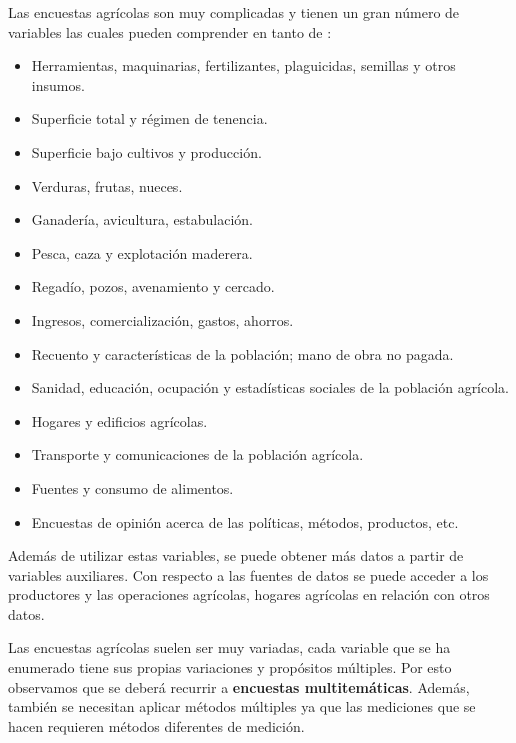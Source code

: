 \documentclass[conference]{IEEEtran}
\begin{document}
\bigbreak

Las encuestas agrícolas son muy complicadas y tienen un gran número de variables las cuales pueden comprender en tanto de \cite{organizacion-de-las-naciones-unidas-para-la-agricultura-y-la-alimentacion-1990}:

\begin{itemize}
    \item Herramientas, maquinarias, fertilizantes, plaguicidas, semillas y otros insumos.
    \item Superficie total y régimen de tenencia.
    \item Superficie bajo cultivos y producción.
    \item Verduras, frutas, nueces.
    \item Ganadería, avicultura, estabulación.
    
    \item Pesca, caza y explotación maderera.
    \item Regadío, pozos, avenamiento y cercado.
    \item Ingresos, comercialización, gastos, ahorros.
    \item Recuento y características de la población; mano de obra no pagada.
    \item Sanidad, educación, ocupación y estadísticas sociales de la población agrícola.
    \item Hogares y edificios agrícolas.
    \item Transporte y comunicaciones de la población agrícola.
    \item Fuentes y consumo de alimentos.
    \item Encuestas de opinión acerca de las políticas, métodos, productos, etc.
\end{itemize}

\bigbreak
    
Además de utilizar estas variables, se puede obtener más datos a partir de variables auxiliares. Con respecto a las fuentes de datos se puede acceder a los productores y las operaciones agrícolas, hogares agrícolas en relación con otros datos.

\bigbreak

Las encuestas agrícolas suelen ser muy variadas, cada variable que se ha enumerado tiene sus propias variaciones y propósitos múltiples. Por esto observamos que se deberá recurrir a \textbf{encuestas multitemáticas}. Además, también se necesitan aplicar métodos múltiples ya que las mediciones que se hacen requieren métodos diferentes de medición.
\end{document}

